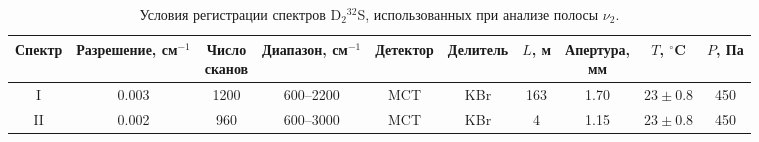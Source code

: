 \begin{table}[htbp]
\centering
\caption{Условия регистрации спектров D$_2{}^{32}$S, использованных при анализе полосы $\nu_2$.}
\label{tab:d2s_experiment}
\begingroup
\scriptsize
\setlength{\tabcolsep}{3pt}
\renewcommand{\arraystretch}{1.15}
\begin{tabular}{|c|c|c|c|c|c|c|c|c|c|}
\hline
Спектр &
\shortstack{Разрешение,\\см$^{-1}$} &
\shortstack{Число\\сканов} &
\shortstack{Диапазон,\\см$^{-1}$} &
Детектор &
Делитель &
\shortstack{$L$,\\м} &
\shortstack{Апертура,\\мм} &
\shortstack{$T$,\\$^\circ$C} &
\shortstack{$P$,\\Па} \\
\hline
I  & 0.003 & 1200 & 600--2200 & MCT & KBr & 163 & 1.70 & $23\pm0.8$ & 450 \\
II & 0.002 & 960  & 600--3000 & MCT & KBr & 4   & 1.15 & $23\pm0.8$ & 450 \\
\hline
\end{tabular}
\endgroup
\end{table}